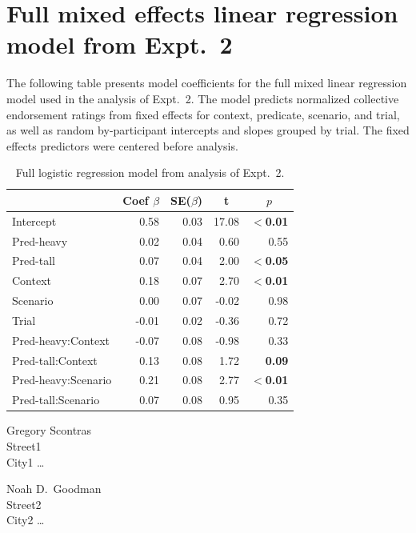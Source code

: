 \documentclass[linguex]{sp}
\begin{document}
\section{Full mixed effects linear regression model from Expt.~2}\label{expt2results}

The following table presents model coefficients for the full mixed linear regression model used in the analysis of Expt.~2. The model predicts normalized collective endorsement ratings from fixed effects for context, predicate, scenario, and trial, as well as random by-participant intercepts and slopes grouped by trial. The fixed effects predictors were centered before analysis.

\begin{table}[h!] 
	\centering \caption{Full logistic regression model from analysis of Expt.~2.} \label{expt2analysis}
\begin{tabular}{lrrrr}\toprule
	&	Coef $\beta$	&	SE($\beta$)	&	\multicolumn{1}{c}{ \textbf{t}}	&	\multicolumn{1}{c}{$p$}\\ \midrule
Intercept	& 	0.58	&	0.03	&	17.08	&	\textbf{$<$0.01} \\
Pred-heavy	&	0.02	&   0.04	&	0.60	&	0.55 \\
Pred-tall	&	0.07	&	0.04	&	2.00	&	\textbf{$<$0.05}\\
Context		&	0.18	&	0.07	&	2.70	&	\textbf{$<$0.01}\\
Scenario	& 	0.00	&	0.07	& 	-0.02	&	0.98 \\
Trial		&	-0.01	&	0.02  	&	-0.36	&   0.72 \\
Pred-heavy:Context	&	-0.07	&	0.08	&	-0.98	&	0.33 \\
Pred-tall:Context	&	0.13	&	0.08	&	1.72	& \textbf{0.09} \\
Pred-heavy:Scenario	&	0.21	&	0.08	&	2.77	&	\textbf{$<$0.01} \\
Pred-tall:Scenario	&	0.07	&	0.08	&	0.95	& 0.35\\
\bottomrule
\end{tabular}
\end{table}


%


\begin{addresses}
	\begin{address}
		Gregory Scontras \\
		Street1 \\
		City1 \ldots \\
	\end{address}
	\begin{address}
		Noah D.~Goodman \\
		Street2 \\
		City2 \dots \\
		\email{author2@email}
	\end{address}
\end{addresses}
\end{document}
